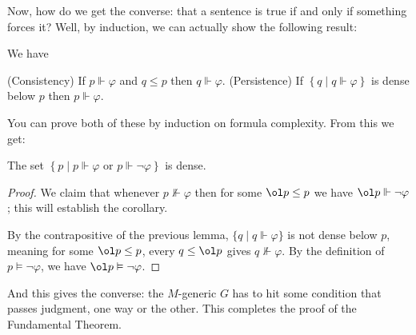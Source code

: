Now, how do we get the converse: that a sentence is true if and only if something forces it?
Well, by induction, we can actually show the following result:
\begin{lemma}
	We have
	\begin{enumerate}[(1)]
		\ii (Consistency) If $p \Vdash \varphi$ and $q \le p$ then $q \Vdash \varphi$.
		\ii (Persistence) If $\left\{ q \mid q \Vdash \varphi \right\}$
		is dense below $p$ then $p \Vdash \varphi$.
	\end{enumerate}
\end{lemma}
You can prove both of these by induction on formula complexity.
From this we get:
\begin{corollary}[Completeness]
	The set $\left\{ p \mid p \Vdash \varphi \text{ or } p \Vdash \neg\varphi \right\}$
	is dense.
\end{corollary}
\begin{proof}
	We claim that whenever $p \not\Vdash \varphi$ then
	for some $\ol p \le p$ we have $\ol p \Vdash \neg\varphi$;
	this will establish the corollary.

	By the contrapositive of the previous lemma,
	$\{q \mid q \Vdash \varphi\}$ is not dense below $p$,
	meaning for some $\ol p \le p$, every $q \le \ol p$ gives $q \not\Vdash \varphi$.
	By the definition of $p \vDash \neg\varphi$,
	we have $\ol p \vDash \neg\varphi$.
\end{proof}
And this gives the converse: the $M$-generic $G$ has to hit some condition
that passes judgment, one way or the other.
This completes the proof of the Fundamental Theorem.

